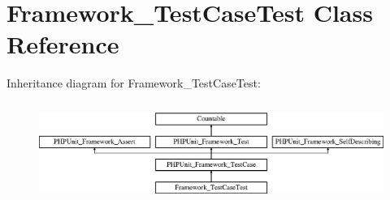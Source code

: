 \hypertarget{class_framework___test_case_test}{}\section{Framework\+\_\+\+Test\+Case\+Test Class Reference}
\label{class_framework___test_case_test}
Inheritance diagram for Framework\+\_\+\+Test\+Case\+Test\+:\begin{figure}[H]
\begin{center}
\leavevmode
\includegraphics[height=3.303835cm]{class_framework___test_case_test}
\end{center}
\end{figure}
